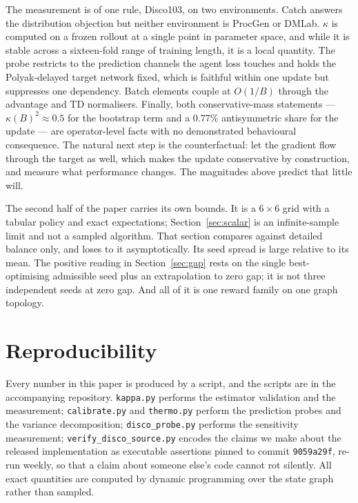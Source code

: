 \documentclass[11pt]{article}
\theoremstyle{remark}
\begin{document}
The measurement is of one rule, Disco103, on two environments. Catch answers the
distribution objection but neither environment is ProcGen or DMLab. $\kappa$ is
computed on a frozen rollout at a single point in parameter space, and while it is
stable across a sixteen-fold range of training length, it is a local quantity.
The probe restricts to the prediction channels the agent loss touches and holds
the Polyak-delayed target network fixed, which is faithful within one update but
suppresses one dependency. Batch elements couple at $O(1/B)$ through the
advantage and TD normalisers. Finally, both conservative-mass statements --- $\kappa(B)^2 \approx 0.5$ for the
bootstrap term and a $0.77\%$ antisymmetric share for the update --- are
operator-level facts with no demonstrated behavioural consequence. The natural
next step is the counterfactual: let the gradient flow through the target as
well, which makes the update conservative by construction, and measure what
performance changes. The magnitudes above predict that little will.

The second half of the paper carries its own bounds. It is a $6\times 6$ grid
with a tabular policy and exact expectations; Section~\ref{sec:scalar} is an
infinite-sample limit and not a sampled algorithm. That section compares against
detailed balance only, and loses to it asymptotically. Its seed spread is large
relative to its mean. The positive reading in Section~\ref{sec:gap} rests on the
single best-optimising admissible seed plus an extrapolation to zero gap; it is
not three independent seeds at zero gap. And all of it is one reward family on
one graph topology.

\section{Reproducibility}

Every number in this paper is produced by a script, and the scripts are in the
accompanying repository. \texttt{kappa.py} performs the estimator validation and
the measurement; \texttt{calibrate.py} and \texttt{thermo.py} perform the
prediction probes and the variance decomposition; \texttt{disco\_probe.py}
performs the sensitivity measurement; \texttt{verify\_disco\_source.py} encodes
the claims we make about the released implementation as executable assertions
pinned to commit \texttt{9059a29f}, re-run weekly, so that a claim about someone
else's code cannot rot silently. All exact quantities are computed by dynamic
programming over the state graph rather than sampled.
\end{document}

